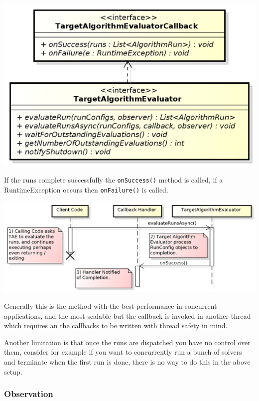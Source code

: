 \documentclass[11pt,letterpaper,oneside]{article}
\begin{document}
\begin{center}
\includegraphics[scale=0.75]{img/UML/TAECallback.png}
\end{center}


If the runs complete successfully the \texttt{onSuccess()} method is called, if a RuntimeException occurs then \texttt{onFailure()} is called.


\begin{center}
\includegraphics[scale=0.75]{img/UML/TAESequence2.png}
\end{center}


Generally this is the method with the best performance in concurrent applications, and the most scalable but the callback is invoked in another thread which requires an the callbacks to be written with thread safety in mind. 

Another limitation is that once the runs are dispatched you have no control over them, consider for example if you want to concurrently run a bunch of solvers and terminate when the first run is done, there is no way to do this in the above setup.

\subsubsection{Observation}
\end{document}

